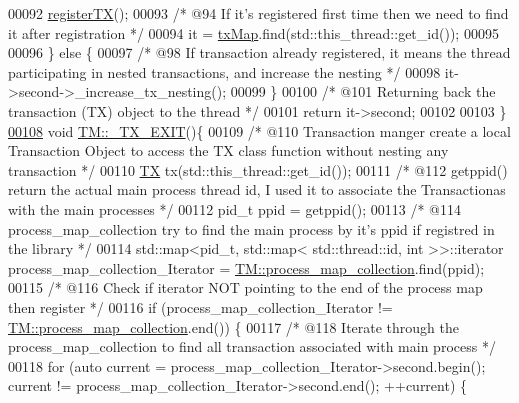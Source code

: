 \begin{DoxyCode}
00092        \hyperlink{class_t_m_a26ea481c24d9aa3aebd6dafb7253376e_a26ea481c24d9aa3aebd6dafb7253376e}{registerTX}();
00093        \textcolor{comment}{/* @94 If it's registered first time then we need to find it after registration */}
00094        it = \hyperlink{class_t_m_a0333dfa193ea99d7626de74a2b932e9b_a0333dfa193ea99d7626de74a2b932e9b}{txMap}.find(std::this\_thread::get\_id());
00095        
00096     \} \textcolor{keywordflow}{else} \{
00097         \textcolor{comment}{/* @98 If transaction already registered, it means the thread participating in nested transactions,
       and increase the nesting */}
00098         it->second->\_increase\_tx\_nesting();
00099     \}
00100     \textcolor{comment}{/* @101 Returning back the transaction (TX) object to the thread */}
00101     \textcolor{keywordflow}{return} it->second;
00102 
00103 \}
\hypertarget{_t_m_8cpp_source.tex_l00108}{}\hyperlink{class_t_m_a5e2d1127f2429f2f524d25f430eade06_a5e2d1127f2429f2f524d25f430eade06}{00108} \textcolor{keywordtype}{void} \hyperlink{class_t_m_a5e2d1127f2429f2f524d25f430eade06_a5e2d1127f2429f2f524d25f430eade06}{TM::\_TX\_EXIT}()\{
00109     \textcolor{comment}{/*  @110 Transaction manger create a local Transaction Object to access the TX class function without
       nesting any transaction */}
00110     \hyperlink{class_t_x}{TX} tx(std::this\_thread::get\_id());
00111     \textcolor{comment}{/* @112 getppid() return the actual main process thread id, I used it to associate the Transactionas
       with the main processes */}
00112     pid\_t ppid = getppid();
00113     \textcolor{comment}{/* @114 process\_map\_collection try to find the main process by it's ppid if registred in the library */}
00114     std::map<pid\_t, std::map< std::thread::id, int >>::iterator process\_map\_collection\_Iterator = 
      \hyperlink{class_t_m_a6d417b18213968da2a70a914e80d639b_a6d417b18213968da2a70a914e80d639b}{TM::process\_map\_collection}.find(ppid);
00115     \textcolor{comment}{/* @116 Check if iterator NOT pointing to the end of the process map then register */}
00116     \textcolor{keywordflow}{if} (process\_map\_collection\_Iterator != \hyperlink{class_t_m_a6d417b18213968da2a70a914e80d639b_a6d417b18213968da2a70a914e80d639b}{TM::process\_map\_collection}.end()) \{
00117         \textcolor{comment}{/* @118 Iterate through the process\_map\_collection to find all transaction associated with main
       process */}
00118         \textcolor{keywordflow}{for} (\textcolor{keyword}{auto} current = process\_map\_collection\_Iterator->second.begin(); current != 
      process\_map\_collection\_Iterator->second.end(); ++current) \{

\end{DoxyCode}

